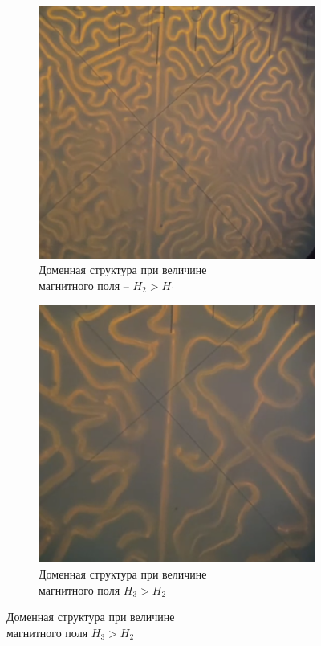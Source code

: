 \documentclass[a4paper,12pt]{article}
\begin{document}
\begin{figure}[h!]
\centering
\begin{subfigure}{.5\textwidth}
  \centering
  \includegraphics[width=0.8\linewidth]{domen_2}
  \caption{Доменная структура при величине \\ магнитного поля -- $H_2 > H_1$}
\end{subfigure}%
\begin{subfigure}{.5\textwidth}
  \centering
  \includegraphics[width=0.8\linewidth]{domen_3}
  \caption{Доменная структура при величине \\ магнитного поля $H_3 > H_2$}
\end{subfigure}
\end{figure}
\end{document}
